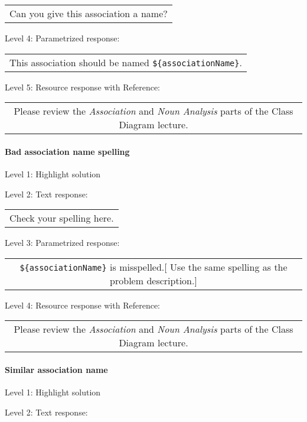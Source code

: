 \begin{tabular}{|c}
Can you give this association a name?
\end{tabular} \medskip

\noindent Level 4: Parametrized response: \medskip

\begin{tabular}{|c}
This association should be named \verb|${associationName}|.
\end{tabular} \medskip

\noindent Level 5: Resource response with Reference:

\begin{tabular}{|c}
Please review the \textit{Association} and \textit{Noun Analysis} parts of the Class Diagram lecture.
\end{tabular} \medskip


\paragraph{Bad association name spelling}

\noindent Level 1: Highlight solution \medskip

\noindent Level 2: Text response: \medskip

\begin{tabular}{|c}
Check your spelling here.
\end{tabular} \medskip

\noindent Level 3: Parametrized response: \medskip

\begin{tabular}{|c}
\verb|${associationName}| is misspelled.[ Use the same spelling as the problem description.]
\end{tabular} \medskip

\noindent Level 4: Resource response with Reference:

\begin{tabular}{|c}
Please review the \textit{Association} and \textit{Noun Analysis} parts of the Class Diagram lecture.
\end{tabular} \medskip


\paragraph{Similar association name}

\noindent Level 1: Highlight solution \medskip

\noindent Level 2: Text response: \medskip

